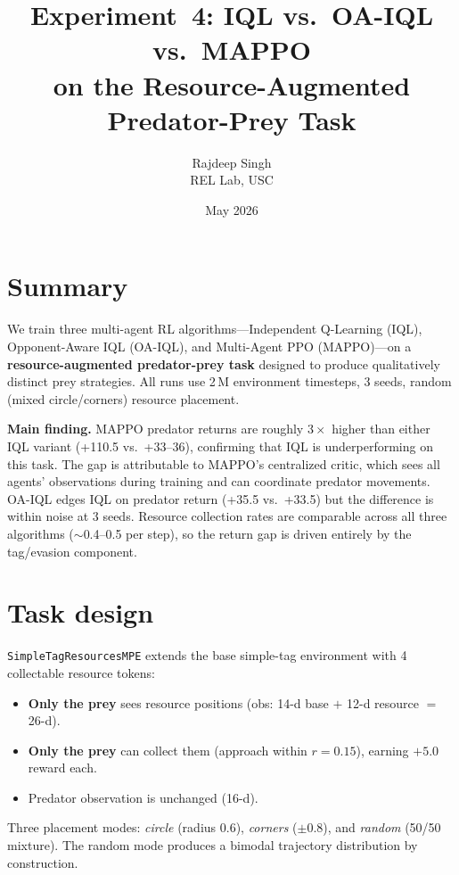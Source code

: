 \documentclass[11pt]{article}
\title{Experiment~4: IQL vs.\ OA-IQL vs.\ MAPPO\\on the Resource-Augmented Predator-Prey Task}
\author{Rajdeep Singh \\ REL Lab, USC}
\date{May 2026}
\begin{document}
\maketitle

\section{Summary}

We train three multi-agent RL algorithms---Independent Q-Learning
(IQL), Opponent-Aware IQL (OA-IQL), and Multi-Agent PPO
(MAPPO)---on a \textbf{resource-augmented predator-prey task} designed
to produce qualitatively distinct prey strategies.  All runs use 2\,M
environment timesteps, 3 seeds, random (mixed circle/corners) resource
placement.

\textbf{Main finding.}  MAPPO predator returns are roughly $3\times$
higher than either IQL variant (+110.5 vs.\ +33--36), confirming
that IQL is underperforming on this task.  The gap is attributable to
MAPPO's centralized critic, which sees all agents' observations during
training and can coordinate predator movements.  OA-IQL edges IQL on
predator return (+35.5 vs.\ +33.5) but the difference is within noise
at 3 seeds.  Resource collection rates are comparable across all three
algorithms ($\sim$0.4--0.5 per step), so the return gap is driven
entirely by the tag/evasion component.


\section{Task design}

\texttt{SimpleTagResourcesMPE} extends the base simple-tag
environment with 4 collectable resource tokens:

\begin{itemize}[nosep]
  \item \textbf{Only the prey} sees resource positions (obs:
        14-d base $+$ 12-d resource $=$ 26-d).
  \item \textbf{Only the prey} can collect them (approach within
        $r=0.15$), earning $+5.0$ reward each.
  \item Predator observation is unchanged (16-d).
\end{itemize}

Three placement modes: \emph{circle} (radius 0.6), \emph{corners}
($\pm 0.8$), and \emph{random} (50/50 mixture).  The random mode
produces a bimodal trajectory distribution by construction.
\end{document}
